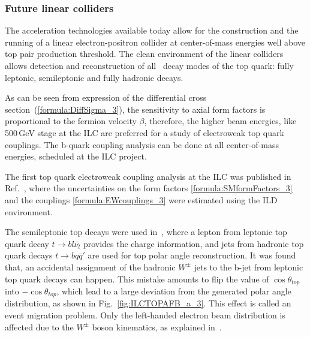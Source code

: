 \subsubsection{Future linear colliders}

The acceleration technologies available today allow for the construction and the running of a linear electron-positron collider at center-of-mass energies well above top pair production threshold. The clean environment of the linear colliders allows detection and reconstruction of all \sm\ decay modes of the top quark: fully leptonic, semileptonic and fully hadronic decays. 



As can be seen from expression of the differential cross section~(\ref{formula:DiffSigma_3}), the sensitivity to axial form factors is proportional to the fermion velocity $\beta$, therefore, the higher beam energies, like 500\,GeV stage at the ILC are preferred for a study of electroweak top quark couplings. 
The b-quark coupling analysis can be done at all center-of-mass energies, scheduled at the ILC project.



The first top quark electroweak coupling analysis at the ILC was published in Ref.~\cite{bib:ILCTOP}, where the uncertainties on the form factors \ref{formula:SMformFactors_3} and the couplings \ref{formula:EWcouplings_3} were estimated using the ILD environment.


The semileptonic top decays were used in~\cite{bib:ILCTOP}, where  a lepton from leptonic top quark decay $t\to b l \bar{\nu_l}$ provides the charge information, and jets from hadronic top quark decays $t \to b q \bar{q}'$ are used for top polar angle reconstruction. 
It was found that, an accidental assignment of the hadronic $W^\pm$ jets to the b-jet from leptonic top quark decays can happen. This mistake 
amounts to flip the value of $\cos\theta_{top}$ into $-\cos\theta_{top}$, which lead to a large deviation from the generated polar angle distribution, as shown in Fig.~\ref{fig:ILCTOPAFB_a_3}.
This effect is called an event migration problem.
Only the left-handed electron beam distribution is affected due to the $W^\pm$ boson kinematics, as explained in~\cite{bib:ILCTOP}. 

